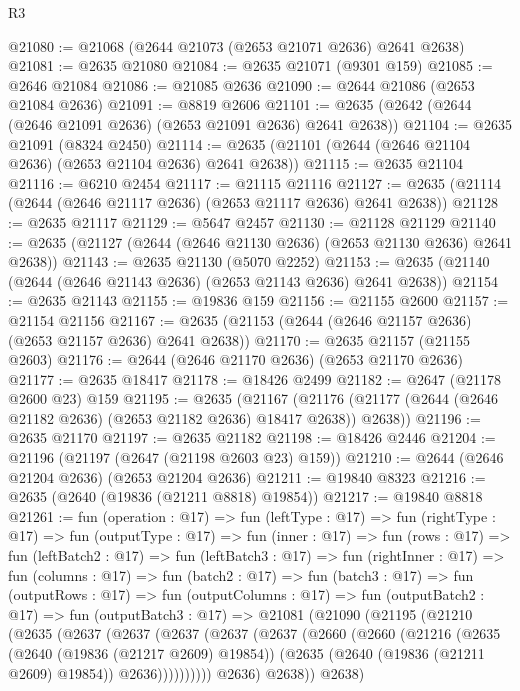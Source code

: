 \begin{lexlean}{R3}
\begin{coremodule}
@21080 := @21068 (@2644 @21073 (@2653 @21071 @2636) @2641 @2638)
@21081 := @2635 @21080
@21084 := @2635 @21071 (@9301 @159)
@21085 := @2646 @21084
@21086 := @21085 @2636
@21090 := @2644 @21086 (@2653 @21084 @2636)
@21091 := @8819 @2606
@21101 := @2635 (@2642 (@2644 (@2646 @21091 @2636) (@2653 @21091 @2636) @2641 @2638))
@21104 := @2635 @21091 (@8324 @2450)
@21114 := @2635 (@21101 (@2644 (@2646 @21104 @2636) (@2653 @21104 @2636) @2641 @2638))
@21115 := @2635 @21104
@21116 := @6210 @2454
@21117 := @21115 @21116
@21127 := @2635 (@21114 (@2644 (@2646 @21117 @2636) (@2653 @21117 @2636) @2641 @2638))
@21128 := @2635 @21117
@21129 := @5647 @2457
@21130 := @21128 @21129
@21140 := @2635 (@21127 (@2644 (@2646 @21130 @2636) (@2653 @21130 @2636) @2641 @2638))
@21143 := @2635 @21130 (@5070 @2252)
@21153 := @2635 (@21140 (@2644 (@2646 @21143 @2636) (@2653 @21143 @2636) @2641 @2638))
@21154 := @2635 @21143
@21155 := @19836 @159
@21156 := @21155 @2600
@21157 := @21154 @21156
@21167 := @2635 (@21153 (@2644 (@2646 @21157 @2636) (@2653 @21157 @2636) @2641 @2638))
@21170 := @2635 @21157 (@21155 @2603)
@21176 := @2644 (@2646 @21170 @2636) (@2653 @21170 @2636)
@21177 := @2635 @18417
@21178 := @18426 @2499
@21182 := @2647 (@21178 @2600 @23) @159
@21195 := @2635
    (@21167 (@21176 (@21177 (@2644 (@2646 @21182 @2636) (@2653 @21182 @2636) @18417 @2638)) @2638))
@21196 := @2635 @21170
@21197 := @2635 @21182
@21198 := @18426 @2446
@21204 := @21196 (@21197 (@2647 (@21198 @2603 @23) @159))
@21210 := @2644 (@2646 @21204 @2636) (@2653 @21204 @2636)
@21211 := @19840 @8323
@21216 := @2635 (@2640 (@19836 (@21211 @8818) @19854))
@21217 := @19840 @8818
@21261 := fun (operation : @17) =>
  fun (leftType : @17) =>
  fun (rightType : @17) =>
  fun (outputType : @17) =>
  fun (inner : @17) =>
  fun (rows : @17) =>
  fun (leftBatch2 : @17) =>
  fun (leftBatch3 : @17) =>
  fun (rightInner : @17) =>
  fun (columns : @17) =>
  fun (batch2 : @17) =>
  fun (batch3 : @17) =>
  fun (outputRows : @17) =>
  fun (outputColumns : @17) =>
  fun (outputBatch2 : @17) =>
  fun (outputBatch3 : @17) =>
  @21081
    (@21090
      (@21195
        (@21210
          (@2635
            (@2637
              (@2637
                (@2637
                  (@2637
                    (@2637
                      (@2660
                        (@2660
                          (@21216
                            (@2635
                              (@2640 (@19836 (@21217 @2609) @19854))
                              (@2635 (@2640 (@19836 (@21211 @2609) @19854)) @2636))))))))))
            @2636)
          @2638))
      @2638)

\end{coremodule}
\end{lexlean}
